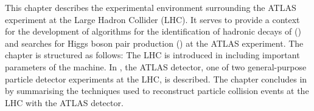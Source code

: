 This chapter describes the experimental environment surrounding the ATLAS
experiment at the Large Hadron Collider (LHC). It serves to provide a context
for the development of algorithms for the identification of hadronic decays of
\tauleptons () and searches for Higgs boson pair production
() at the ATLAS experiment. The
chapter is structured as follows: The LHC is introduced in 
including important parameters of the machine. In , the ATLAS
detector, one of two general-purpose particle detector experiments at the LHC,
is described. The chapter concludes in  by
summarising the techniques used to reconstruct particle collision events at the
LHC with the ATLAS detector.

